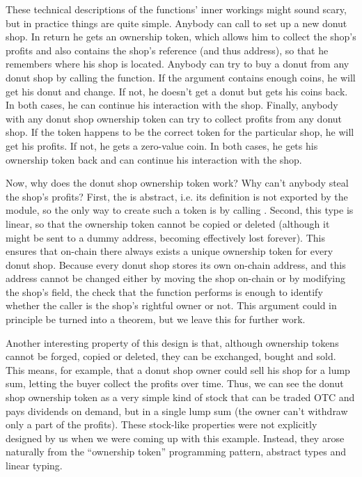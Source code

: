 These technical descriptions of the functions' inner workings might sound scary, but in practice things are quite simple. Anybody can call  to set up a new donut shop. In return he gets an ownership token, which allows him to collect the shop's profits and also contains the shop's reference (and thus address), so that he remembers where his shop is located. Anybody can try to buy a donut from any donut shop by calling the  function. If the argument contains enough coins, he will get his donut and change. If not, he doesn't get a donut but gets his coins back. In both cases, he can continue his interaction with the shop. Finally, anybody with any donut shop ownership token can try to collect profits from any donut shop. If the token happens to be the correct token for the particular shop, he will get his profits. If not, he gets a zero-value coin. In both cases, he gets his ownership token back and can continue his interaction with the shop.

Now, why does the donut shop ownership token work? Why can't anybody steal the shop's profits? First, the  is abstract, i.e. its definition is not exported by the module, so the only way to create such a token is by calling . Second, this type is linear, so that the ownership token cannot be copied or deleted (although it might be sent to a dummy address, becoming effectively lost forever). This ensures that on-chain there always exists a unique ownership token for every donut shop. Because every donut shop stores its own on-chain address, and this address cannot be changed either by moving the shop on-chain or by modifying the shop's  field, the check that the  function performs is enough to identify whether the caller is the shop's rightful owner or not. This argument could in principle be turned into a theorem, but we leave this for further work.

Another interesting property of this design is that, although ownership tokens cannot be forged, copied or deleted, they can be exchanged, bought and sold. This means, for example, that a donut shop owner could sell his shop for a lump sum, letting the buyer collect the profits over time. Thus, we can see the donut shop ownership token as a very simple kind of stock that can be traded OTC and pays dividends on demand, but in a single lump sum (the owner can't withdraw only a part of the profits). These stock-like properties were not explicitly designed by us when we were coming up with this example. Instead, they arose naturally from the ``ownership token'' programming pattern, abstract types and linear typing.

